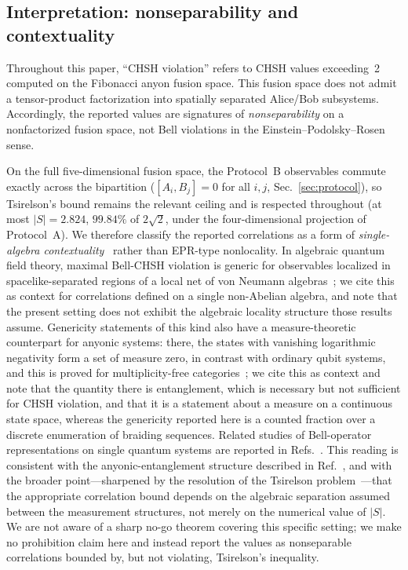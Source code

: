 \documentclass[aps,pra,twocolumn,superscriptaddress,longbibliography,floatfix,nofootinbib]{revtex4-2}
\begin{document}
\subsection{Interpretation: nonseparability and contextuality}
\label{fn:nonsep}

Throughout this paper, ``CHSH violation'' refers to CHSH values
exceeding~2 computed on the Fibonacci anyon fusion space. This fusion
space does not admit a tensor-product factorization into spatially
separated Alice/Bob subsystems. Accordingly, the reported values are
signatures of \emph{nonseparability} on a nonfactorized fusion space, not Bell
violations in the Einstein--Podolsky--Rosen sense.

On the full five-dimensional fusion space, the Protocol~B observables
commute exactly across the bipartition ($[A_i,B_j]=0$ for all $i,j$,
Sec.~\ref{sec:protocol}), so Tsirelson's bound remains the relevant
ceiling and is respected throughout (at most $|S|=2.824$, $99.84\%$ of
$2\sqrt{2}$, under the four-dimensional projection of Protocol~A).
We therefore classify the reported
correlations as a form of \emph{single-algebra
contextuality}~\cite{Chou2025} rather than EPR-type nonlocality. In
algebraic quantum field theory, maximal Bell-CHSH violation is generic
for observables localized in spacelike-separated regions of a local net
of von Neumann algebras~\cite{SummersWerner1987}; we cite this as
context for correlations defined on a single non-Abelian algebra, and
note that the present setting does not exhibit the algebraic locality
structure those results assume. Genericity statements of this kind also have
a measure-theoretic counterpart for anyonic systems: there, the states with
vanishing logarithmic negativity form a set of measure zero, in contrast with
ordinary qubit systems, and this is proved for multiplicity-free
categories~\cite{ShapourianMongRyu2020}; we cite this as context and note
that the quantity there is entanglement, which is necessary but not sufficient
for CHSH violation, and that it is a statement about a measure on a continuous
state space, whereas the genericity reported here is a counted fraction over a
discrete enumeration of braiding sequences. Related studies of Bell-operator
representations on single quantum systems are reported in
Refs.~\cite{GuimaraesRoditiSorella2024,DeFabritiisEtAl2023}. This
reading is consistent with the anyonic-entanglement structure
described in Ref.~\cite{BondersonKnappPatel2017}, and with the
broader point---sharpened by the resolution of the Tsirelson
problem~\cite{JiNatarajanVidickWrightYuen2020}---that the
appropriate correlation bound depends on the algebraic separation
assumed between the measurement structures, not merely on the
numerical value of $|S|$. We are not aware of a sharp no-go
theorem covering this specific setting; we make no
prohibition claim here and instead report the values as
nonseparable correlations bounded by, but not
violating, Tsirelson's inequality.
\end{document}
